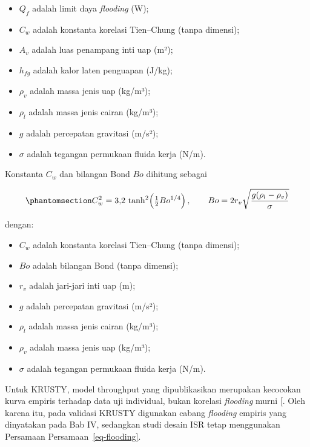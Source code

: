 \documentclass[
  indonesian,
  12pt,
  a4paper,
]{report}
\providecommand{\tightlist}{%
  \setlength{\itemsep}{0pt}\setlength{\parskip}{0pt}}
\begin{document}
\begin{itemize}
\tightlist
\item
  \(Q_f\) adalah limit daya \emph{flooding} (W);
\item
  \(C_w\) adalah konstanta korelasi Tien--Chung (tanpa dimensi);
\item
  \(A_v\) adalah luas penampang inti uap (m²);
\item
  \(h_{fg}\) adalah kalor laten penguapan (J/kg);
\item
  \(\rho_v\) adalah massa jenis uap (kg/m³);
\item
  \(\rho_l\) adalah massa jenis cairan (kg/m³);
\item
  \(g\) adalah percepatan gravitasi (m/s²);
\item
  \(\sigma\) adalah tegangan permukaan fluida kerja (N/m).
\end{itemize}

Konstanta \(C_w\) dan bilangan Bond \(Bo\) dihitung sebagai

\begin{equation}\protect\phantomsection\label{eq-bo}{ C_w^2 = 3{,}2\,\tanh^2\!\left(\tfrac{1}{2}Bo^{1/4}\right), \qquad
   Bo = 2r_v\sqrt{\frac{g(\rho_l-\rho_v)}{\sigma}} }\end{equation}

dengan:

\begin{itemize}
\tightlist
\item
  \(C_w\) adalah konstanta korelasi Tien--Chung (tanpa dimensi);
\item
  \(Bo\) adalah bilangan Bond (tanpa dimensi);
\item
  \(r_v\) adalah jari-jari inti uap (m);
\item
  \(g\) adalah percepatan gravitasi (m/s²);
\item
  \(\rho_l\) adalah massa jenis cairan (kg/m³);
\item
  \(\rho_v\) adalah massa jenis uap (kg/m³);
\item
  \(\sigma\) adalah tegangan permukaan fluida kerja (N/m).
\end{itemize}

Untuk KRUSTY, model throughput yang dipublikasikan merupakan kecocokan
kurva empiris terhadap data uji individual, bukan korelasi
\emph{flooding} murni {[}\citeproc{ref-poston2020results}{5}{]}. Oleh
karena itu, pada validasi KRUSTY digunakan cabang \emph{flooding}
empiris yang dinyatakan pada Bab IV, sedangkan studi desain ISR tetap
menggunakan Persamaan Persamaan~\ref{eq-flooding}.
\end{document}
